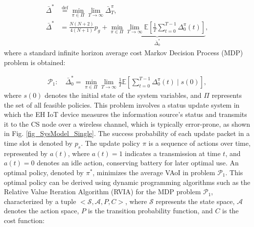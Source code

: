 \documentclass[lettersize,journal]{IEEEtran}
\begin{document}
    \begin{align}
        \bar{\Delta}^\ast &\overset{\text{def}}{=} \min_{\pi \in \Pi} \lim_{T \rightarrow \infty} \bar{\Delta}_T^\pi, \\
        \bar{\Delta}^\ast &= \frac{N(N+2)}{4(N+1)}p_g + \underbrace{\min_{\pi \in \Pi} \lim_{T \rightarrow \infty} \mathbb{E} \left[ \frac{1}{T} \sum_{t=0}^{T-1}  \Delta_0^\pi(t) \right]}_{\bar{\Delta}_0^\ast},
    \end{align}
    where a standard infinite horizon average cost Markov Decision Process (MDP) problem is obtained:

    \begin{align}
        \mathcal{P}_1: \quad \bar{\Delta}_0^\ast = \min_{\pi \in \Pi} \lim_{T \rightarrow \infty} \frac{1}{T} \mathbb{E} \left[  \sum_{t=0}^{T-1}  \Delta_0^\pi(t) \! \mid \! s(0) \right],
    \end{align}
    where $s(0)$ denotes the initial state of the system variables, and $\Pi$ represents the set of all feasible policies. This problem involves a status update system in which the EH IoT device measures the information source's status and transmits it to the CS node over a wireless channel, which is typically error-prone, as shown in Fig. \ref{fig_SysModel_Single}. The success probability of each update packet in a time slot is denoted by $p_s$. The update policy $\pi$ is a sequence of actions over time, represented by $a(t)$, where $a(t)=1$ indicates a transmission at time $t$, and $a(t)=0$ denotes an idle action, conserving battery for later optimal use. An optimal policy, denoted by $\pi^\ast$, minimizes the average VAoI in problem $\mathcal{P}_1$. This optimal policy can be derived using dynamic programming algorithms such as the Relative Value Iteration Algorithm (RVIA)\cite{puterman2014markov} for the MDP problem $\mathcal{P}_1$, characterized by a tuple $<\mathcal{S},\mathcal{A},P,C>$, where $\mathcal{S}$ represents the state space, $\mathcal{A}$ denotes the action space, $P$ is the transition probability function, and $C$ is the cost function:
\end{document}
